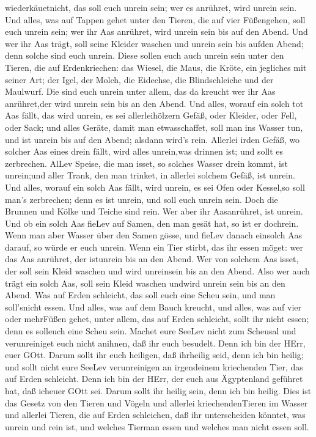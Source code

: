 wiederkäuetnicht, das soll euch unrein sein; wer es anrühret, wird
unrein sein.  Und alles, was auf Tappen gehet unter den
Tieren, die auf vier Füßengehen, soll euch unrein sein; wer ihr Aas
anrühret, wird unrein sein bis auf den Abend.  Und wer ihr
Aas trägt, soll seine Kleider waschen und unrein sein bis aufden Abend;
denn solche sind euch unrein.  Diese sollen euch auch
unrein sein unter den Tieren, die auf Erdenkriechen: das Wiesel, die
Maus, die Kröte, ein jegliches mit seiner Art;  der Igel,
der Molch, die Eidechse, die Blindschleiche und der Maulwurf.
 Die sind euch unrein unter allem, das da kreucht wer ihr
Aas anrühret,der wird unrein sein bis an den Abend.  Und
alles, worauf ein solch tot Aas fällt, das wird unrein, es sei
allerleihölzern Gefäß, oder Kleider, oder Fell, oder Sack; und alles
Geräte, damit man etwasschaffet, soll man ins Wasser tun, und ist unrein
bis auf den Abend; alsdann wird's rein.  Allerlei irden
Gefäß, wo solcher Aas eines drein fällt, wird alles unrein,was drinnen
ist; und sollt es zerbrechen.  AlLev Speise, die man isset,
so solches Wasser drein kommt, ist unrein;und aller Trank, den man
trinket, in allerlei solchem Gefäß, ist unrein.  Und alles,
worauf ein solch Aas fällt, wird unrein, es sei Ofen oder Kessel,so soll
man's zerbrechen; denn es ist unrein, und soll euch unrein sein.
 Doch die Brunnen und Kölke und Teiche sind rein. Wer aber
ihr Aasanrühret, ist unrein.  Und ob ein solch Aas fieLev
auf Samen, den man gesät hat, so ist er dochrein.  Wenn man
aber Wasser über den Samen gösse, und fieLev danach einsolch Aas darauf,
so würde er euch unrein.  Wenn ein Tier stirbt, das ihr
essen möget: wer das Aas anrühret, der istunrein bis an den Abend.
 Wer von solchem Aas isset, der soll sein Kleid waschen und
wird unreinsein bis an den Abend. Also wer auch trägt ein solch Aas,
soll sein Kleid waschen undwird unrein sein bis an den Abend.
 Was auf Erden schleicht, das soll euch eine Scheu sein,
und man soll'snicht essen.  Und alles, was auf dem Bauch
kreucht, und alles, was auf vier oder mehrFüßen gehet, unter allem, das
auf Erden schleicht, sollt ihr nicht essen; denn es solleuch eine Scheu
sein.  Machet eure SeeLev nicht zum Scheusal und
verunreiniget euch nicht anihnen, daß ihr euch besudelt. 
Denn ich bin der HErr, euer GOtt. Darum sollt ihr euch heiligen, daß
ihrheilig seid, denn ich bin heilig; und sollt nicht eure SeeLev
verunreinigen an irgendeinem kriechenden Tier, das auf Erden schleicht.
 Denn ich bin der HErr, der euch aus Ägyptenland geführet
hat, daß icheuer GOtt sei. Darum sollt ihr heilig sein, denn ich bin
heilig.  Dies ist das Gesetz von den Tieren und Vögeln und
allerlei kriechendenTieren im Wasser und allerlei Tieren, die auf Erden
schleichen,  daß ihr unterscheiden könntet, was unrein und
rein ist, und welches Tierman essen und welches man nicht essen soll.

